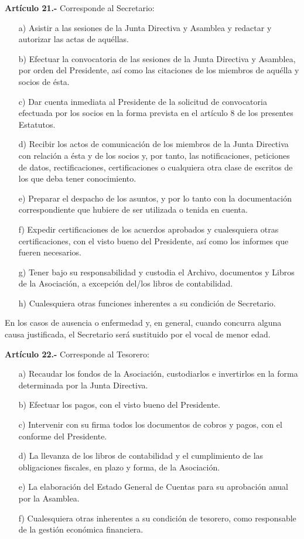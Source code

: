 \documentclass[a4paper,12pt]{article}
\begin{document}
\begin{onehalfspace}
\textbf{Artículo 21.-} Corresponde al Secretario:
\begin{itemize}
\item [a)] Asistir a las sesiones de la Junta Directiva y Asamblea y redactar y autorizar las actas de aquéllas.
\item [b)] Efectuar la convocatoria de las sesiones de la Junta Directiva y Asamblea, por orden del Presidente, así como las citaciones de los miembros de aquélla y socios de ésta.
\item [c)] Dar cuenta inmediata al Presidente de la solicitud de convocatoria efectuada por los socios en la forma prevista en el artículo 8 de los presentes Estatutos.
\item [d)] Recibir los actos de comunicación de los miembros de la Junta Directiva con relación a ésta y de los socios y, por tanto, las notificaciones, peticiones de datos, rectificaciones, certificaciones o cualquiera otra clase de escritos de los que deba tener conocimiento.
\item [e)] Preparar el despacho de los asuntos, y por lo tanto con la documentación correspondiente que hubiere de ser utilizada o tenida en cuenta.
\item [f)] Expedir certificaciones de los acuerdos aprobados y cualesquiera otras certificaciones, con el visto bueno del Presidente, así como los informes que fueren necesarios.
\item [g)] Tener bajo su responsabilidad y custodia el Archivo, documentos y Libros de la Asociación, a excepción del/los libros de contabilidad.
\item [h)] Cualesquiera otras funciones inherentes a su condición de Secretario.
\end{itemize}

En los casos de ausencia o enfermedad y, en general, cuando concurra alguna causa justificada, el Secretario será sustituido por el vocal de menor edad.

\bigskip\bigskip

\textbf{Artículo 22.-} Corresponde al Tesorero:
\begin{itemize}
\item [a)] Recaudar los fondos de la Asociación, custodiarlos e invertirlos en la forma determinada por la Junta Directiva.
\item [b)] Efectuar los pagos, con el visto bueno del Presidente.
\item [c)] Intervenir con su firma todos los documentos de cobros y pagos, con el conforme del Presidente.
\item [d)] La llevanza de los libros de contabilidad y el cumplimiento de las obligaciones fiscales, en plazo y forma, de la Asociación.
\item [e)] La elaboración del Estado General de Cuentas para su aprobación anual por la Asamblea.
\item [f)] Cualesquiera otras inherentes a su condición de tesorero, como responsable de la gestión económica financiera.
\end{itemize}


\end{onehalfspace}
\end{document}
